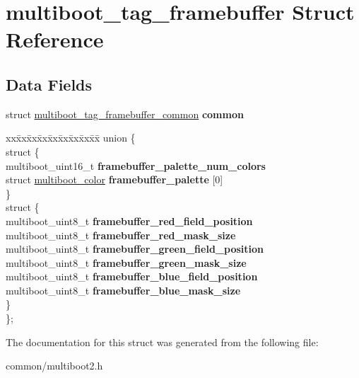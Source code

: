 \hypertarget{structmultiboot__tag__framebuffer}{}\section{multiboot\+\_\+tag\+\_\+framebuffer Struct Reference}
\label{structmultiboot__tag__framebuffer}
\subsection*{Data Fields}
\begin{DoxyCompactItemize}
\item 
struct \hyperlink{structmultiboot__tag__framebuffer__common}{multiboot\+\_\+tag\+\_\+framebuffer\+\_\+common} {\bfseries common}\hypertarget{structmultiboot__tag__framebuffer_aa08ac999e6f190bc67387683f2d1ff76}{}\label{structmultiboot__tag__framebuffer_aa08ac999e6f190bc67387683f2d1ff76}

\item 
\begin{tabbing}
xx\=xx\=xx\=xx\=xx\=xx\=xx\=xx\=xx\=\kill
union \{\\
\>struct \{\\
\>\>multiboot\_uint16\_t {\bfseries framebuffer\_palette\_num\_colors}\\
\>\>struct \hyperlink{structmultiboot__color}{multiboot\_color} {\bfseries framebuffer\_palette} \mbox{[}0\mbox{]}\\
\>\} \hypertarget{unionmultiboot__tag__framebuffer_1_1_0D14_af34cfa330896e91ee6bdf4085fcfc15d}{}\label{unionmultiboot__tag__framebuffer_1_1_0D14_af34cfa330896e91ee6bdf4085fcfc15d}
\\
\>struct \{\\
\>\>multiboot\_uint8\_t {\bfseries framebuffer\_red\_field\_position}\\
\>\>multiboot\_uint8\_t {\bfseries framebuffer\_red\_mask\_size}\\
\>\>multiboot\_uint8\_t {\bfseries framebuffer\_green\_field\_position}\\
\>\>multiboot\_uint8\_t {\bfseries framebuffer\_green\_mask\_size}\\
\>\>multiboot\_uint8\_t {\bfseries framebuffer\_blue\_field\_position}\\
\>\>multiboot\_uint8\_t {\bfseries framebuffer\_blue\_mask\_size}\\
\>\} \hypertarget{unionmultiboot__tag__framebuffer_1_1_0D14_a205ec635c433dda3ca71c2990dc1bfb0}{}\label{unionmultiboot__tag__framebuffer_1_1_0D14_a205ec635c433dda3ca71c2990dc1bfb0}
\\
\}; \hypertarget{structmultiboot__tag__framebuffer_afa47cb8fda6b4791bdd01273b31c12b9}{}\label{structmultiboot__tag__framebuffer_afa47cb8fda6b4791bdd01273b31c12b9}
\\

\end{tabbing}\end{DoxyCompactItemize}


The documentation for this struct was generated from the following file\+:\begin{DoxyCompactItemize}
\item 
common/multiboot2.\+h\end{DoxyCompactItemize}
